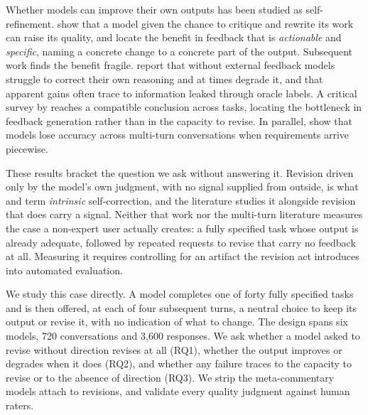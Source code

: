 Whether models can improve their own outputs has been studied as self-refinement.
\citet{madaan2024self} show that a model given the chance to critique and rewrite its work
can raise its quality, and locate the benefit in feedback that is \emph{actionable} and
\emph{specific}, naming a concrete change to a concrete part of the output. Subsequent work
finds the benefit fragile. \citet{huang2024large} report that without external feedback
models struggle to correct their own reasoning and at times degrade it, and that apparent
gains often trace to information leaked through oracle labels. A critical survey by
\citet{kamoi2024selfcorrection} reaches a compatible conclusion across tasks, locating the
bottleneck in feedback generation rather than in the capacity to revise. In parallel,
\citet{laban2025lost} show that models lose accuracy across multi-turn conversations when
requirements arrive piecewise.

These results bracket the question we ask without answering it. Revision driven only by the
model's own judgment, with no signal supplied from outside, is what
\citet{kamoi2024selfcorrection} and \citet{huang2024large} term \emph{intrinsic}
self-correction, and the literature studies it alongside revision that does carry a signal.
Neither that work nor the multi-turn literature measures the case a non-expert user
actually creates: a fully specified task whose output is already adequate, followed by
repeated requests to revise that carry no feedback at all. Measuring it requires
controlling for an artifact the revision act introduces into automated evaluation.

We study this case directly. A model completes one of forty fully specified tasks and is
then offered, at each of four subsequent turns, a neutral choice to keep its output or
revise it, with no indication of what to change. The design spans six models, 720
conversations and 3,600 responses. We ask whether a model asked to revise without direction
revises at all (RQ1), whether the output improves or degrades when it does (RQ2), and
whether any failure traces to the capacity to revise or to the absence of direction (RQ3).
We strip the meta-commentary models attach to revisions, and validate every quality
judgment against human raters.


